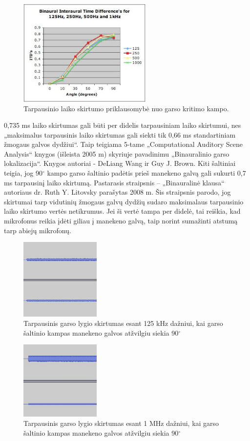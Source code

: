 \documentclass[]{vgtuef}
\begin{document}
\begin{figure}[!ht]
  \centering
  \includegraphics[width=250px]{img/TLS_degree.png}
  \caption{Tarpausinio laiko skirtumo priklausomybė nuo garso kritimo kampo.}
  \label{fig:TLS_degree}
\end{figure}

0,735 ms laiko skirtumas gali būti per didelis tarpausiniam laiko skirtumui, nes „maksimalus tarpausinis laiko skirtumas gali siekti tik 0,66 ms standartiniam žmogaus galvos dydžiui“. Taip teigiama 5-tame „Computational Auditory Scene Analysis“ knygos (išleista 2005 m) skyriuje pavadinimu „Binauralinio garso lokalizacija“. Knygos autoriai - DeLiang Wang ir Guy J. Brown. Kiti šaltiniai teigia, jog 90$^\circ$ kampo garso šaltinio padėtis prieš manekeno galvą gali sukurti 0,7 ms tarpausinį laiko skirtumą. Pastarasis straipsnis – „Binauralinė klausa“ autoriaus dr. Ruth Y. Litovsky parašytas 2008 m. Šis straipsnis parodo, jog skirtumai tarp vidutinių žmogaus galvų dydžių sudaro maksimalaus tarpausinio laiko skirtumo vertės netikrumus. Jei ši vertė tampa per didelė, tai reiškia, kad mikrofonus reikia įdėti giliau į manekeno galvą, taip norint sumažinti atstumą tarp abiejų mikrofonų.

\begin{figure}[!h]
  \centering
  \includegraphics[width=150px]{img/125kHz_TGLS.png}
  \caption{Tarpausinis garso lygio skirtumas esant 125 kHz dažniui, kai garso šaltinio kampas manekeno galvos atžvilgiu siekia 90$^\circ$}
  \label{fig:125kHz_TGLS}
\end{figure}

\begin{figure}[!h]
  \centering
  \includegraphics[width=150px]{img/1000kHz_TGLS.png}
  \caption{Tarpausinis garso lygio skirtumas esant 1 MHz dažniui, kai garso šaltinio kampas manekeno galvos atžvilgiu siekia 90$^\circ$}
  \label{fig:1000kHz_TGLS}
\end{figure}
\end{document}
